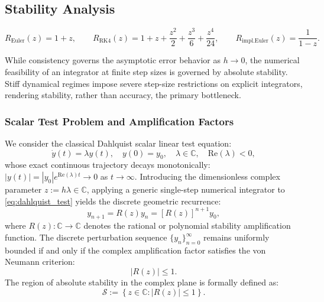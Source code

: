 \documentclass[11pt,a4paper]{article}
\theoremstyle{definition}
\theoremstyle{remark}
\begin{document}
\subsection{Stability Analysis}

\begin{equation}
    R_{\text{Euler}}(z) = 1 + z, \qquad
    R_{\text{RK4}}(z) = 1 + z + \frac{z^2}{2} + \frac{z^3}{6} + \frac{z^4}{24},
    \qquad
    R_{\text{impl.Euler}}(z) = \frac{1}{1 - z}.
\end{equation}

\label{sec:stability_analysis}

While consistency governs the asymptotic error behavior as $h \to 0$, the numerical feasibility of an integrator at finite step sizes is governed by absolute stability. Stiff dynamical regimes impose severe step-size restrictions on explicit integrators, rendering stability, rather than accuracy, the primary bottleneck.

\subsubsection{Scalar Test Problem and Amplification Factors}
We consider the classical Dahlquist scalar linear test equation:
\begin{equation}
\label{eq:dahlquist_test}
\dot{y}(t) = \lambda y(t), \quad y(0) = y_0, \quad \lambda \in \mathbb{C}, \quad \mathrm{Re}(\lambda) < 0,
\end{equation}
whose exact continuous trajectory decays monotonically: $|y(t)| = |y_0| e^{\mathrm{Re}(\lambda)t} \to 0$ as $t \to \infty$. Introducing the dimensionless complex parameter $z := h\lambda \in \mathbb{C}$, applying a generic single-step numerical integrator to \eqref{eq:dahlquist_test} yields the discrete geometric recurrence:
\begin{equation}
\label{eq:discrete_recurrence}
y_{n+1} = R(z) y_n = \left[R(z)\right]^{n+1} y_0,
\end{equation}
where $R(z): \mathbb{C} \to \mathbb{C}$ denotes the rational or polynomial stability amplification function. The discrete perturbation sequence $\{y_n\}_{n=0}^\infty$ remains uniformly bounded if and only if the complex amplification factor satisfies the von Neumann criterion:
\begin{equation}
\label{eq:stability_criterion}
|R(z)| \le 1.
\end{equation}
The region of absolute stability in the complex plane is formally defined as:
\begin{equation}
\label{eq:stability_region_def}
\mathcal{S} := \left\{ z \in \mathbb{C} : |R(z)| \le 1 \right\}.
\end{equation}
\end{document}
